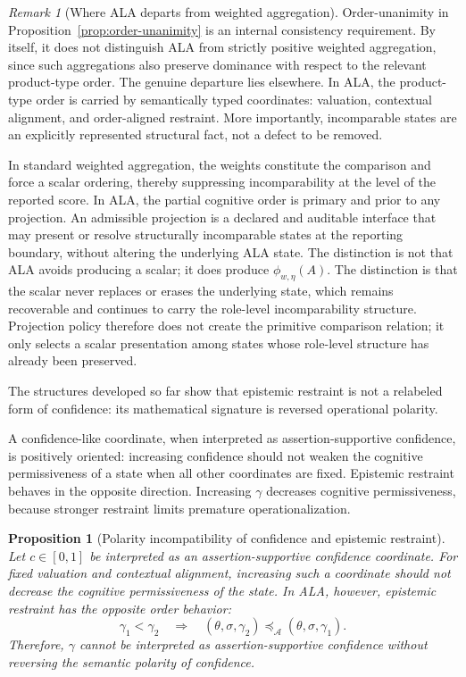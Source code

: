 \documentclass[reqno,final]{amsart}
\theoremstyle{definition}
\theoremstyle{plain}
\newtheorem{proposition}{Proposition}
\theoremstyle{remark}
\newtheorem{remark}{Remark}
\providecommand{\preceqA}{\preceq_{\mathcal A}}
\begin{document}
\begin{remark}[Where ALA departs from weighted aggregation]
\label{rem:projection-vs-weighted-aggregation}
Order-unanimity in Proposition~\ref{prop:order-unanimity} is an internal
consistency requirement. By itself, it does not distinguish ALA from
strictly positive weighted aggregation, since such aggregations also
preserve dominance with respect to the relevant product-type order. The
genuine departure lies elsewhere. In ALA, the product-type order is carried
by semantically typed coordinates: valuation, contextual alignment, and
order-aligned restraint. More importantly, incomparable states are an
explicitly represented structural fact, not a defect to be removed.

In standard weighted aggregation, the weights constitute the comparison and
force a scalar ordering, thereby suppressing incomparability at the level of
the reported score. In ALA, the partial cognitive order is primary and prior
to any projection. An admissible projection is a declared and auditable
interface that may present or resolve structurally incomparable states at
the reporting boundary, without altering the underlying ALA state. The
distinction is not that ALA avoids producing a scalar; it does produce
\(\phi_{w,\eta}(A)\). The distinction is that the scalar never replaces or
erases the underlying state, which remains recoverable and continues to
carry the role-level incomparability structure. Projection policy therefore
does not create the primitive comparison relation; it only selects a scalar
presentation among states whose role-level structure has already been
preserved.
\end{remark}

\label{subsec:polarity_signature_restraint}

The structures developed so far show that epistemic restraint is not a relabeled form of confidence: its mathematical signature is reversed operational polarity.

A confidence-like coordinate, when interpreted as assertion-supportive confidence, is positively oriented: increasing confidence should not weaken the cognitive permissiveness of a state when all other coordinates are fixed. Epistemic restraint behaves in the opposite direction. Increasing \(\gamma\) decreases cognitive permissiveness, because stronger restraint limits premature operationalization.

\begin{proposition}[Polarity incompatibility of confidence and epistemic restraint]
Let \(c\in[0,1]\) be interpreted as an assertion-supportive confidence coordinate. For fixed valuation and contextual alignment, increasing such a coordinate should not decrease the cognitive permissiveness of the state. In ALA, however, epistemic restraint has the opposite order behavior:
\[
\gamma_1<\gamma_2
\quad\Longrightarrow\quad
(\theta,\sigma,\gamma_2)\preceqA(\theta,\sigma,\gamma_1).
\]
Therefore, \(\gamma\) cannot be interpreted as assertion-supportive confidence without reversing the semantic polarity of confidence.
\end{proposition}
\end{document}
